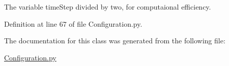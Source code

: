 The variable time\-Step divided by two, for computaional efficiency. 



Definition at line 67 of file Configuration.\-py.



The documentation for this class was generated from the following file\-:\begin{DoxyCompactItemize}
\item 
\hyperlink{_configuration_8py}{Configuration.\-py}\end{DoxyCompactItemize}

